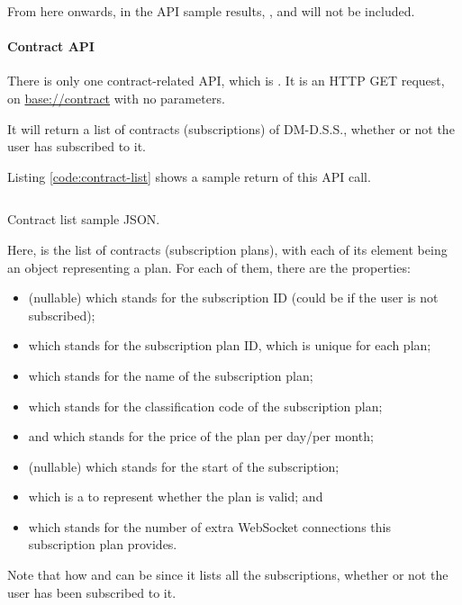 From here onwards, in the API sample results, ,  and  will not be included.

\paragraph{Contract API}

There is only one contract-related API, which is . It is an HTTP GET request, on \url{base://contract} with no parameters.

It will return a list of contracts (subscriptions) of DM-D.S.S., whether or not the user has subscribed to it.

Listing \ref{code:contract-list} shows a sample return of this API call.
\begin{listing}[htp]
    \inputminted{json}{code/ContractList.json}
    \caption{Contract list sample JSON.}
    \label{code:contract-list}
\end{listing}

Here,  is the list of contracts (subscription plans), with each of its element being an object representing a plan. For each of them, there are the properties:
\begin{itemize}
    \item {} (nullable) which stands for the subscription ID (could be  if the user is not subscribed);
    \item {} which stands for the subscription plan ID, which is unique for each plan;
    \item {} which stands for the name of the subscription plan;
    \item {} which stands for the classification code of the subscription plan;
    \item {} and  which stands for the price of the plan per day/per month;
    \item {} (nullable) which stands for the start of the subscription;
    \item {} which is a  to represent whether the plan is valid; and
    \item {} which stands for the number of extra WebSocket connections this subscription plan provides.
\end{itemize}

Note that how  and  can be  since it lists all the subscriptions, whether or not the user has been subscribed to it.

